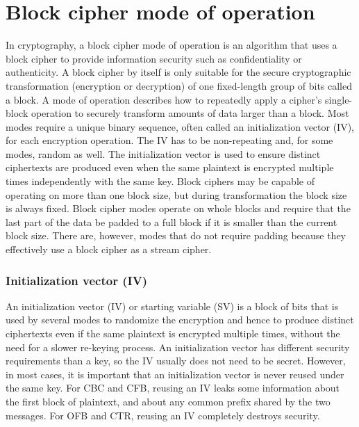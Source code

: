 \documentclass[a4paper, 10pt, titlepage]{article}
\begin{document}
\section{Block cipher mode of operation}
In cryptography, a block cipher mode of operation is an algorithm that uses a block cipher to provide information security such as confidentiality or authenticity. A block cipher by itself is only suitable for the secure cryptographic transformation (encryption or decryption) of one fixed-length group of bits called a block. A mode of operation describes how to repeatedly apply a cipher's single-block operation to securely transform amounts of data larger than a block.
Most modes require a unique binary sequence, often called an initialization vector (IV), for each encryption operation. The IV has to be non-repeating and, for some modes, random as well. The initialization vector is used to ensure distinct ciphertexts are produced even when the same plaintext is encrypted multiple times independently with the same key.
Block ciphers may be capable of operating on more than one block size, but during transformation the block size is always fixed. Block cipher modes operate on whole blocks and require that the last part of the data be padded to a full block if it is smaller than the current block size. There are, however, modes that do not require padding because they effectively use a block cipher as a stream cipher.

\subsubsection*{Initialization vector (IV)}
An initialization vector (IV) or starting variable (SV) is a block of bits that is used by several modes to randomize the encryption and hence to produce distinct ciphertexts even if the same plaintext is encrypted multiple times, without the need for a slower re-keying process.
An initialization vector has different security requirements than a key, so the IV usually does not need to be secret. However, in most cases, it is important that an initialization vector is never reused under the same key. For CBC and CFB, reusing an IV leaks some information about the first block of plaintext, and about any common prefix shared by the two messages. For OFB and CTR, reusing an IV completely destroys security.
\end{document}
